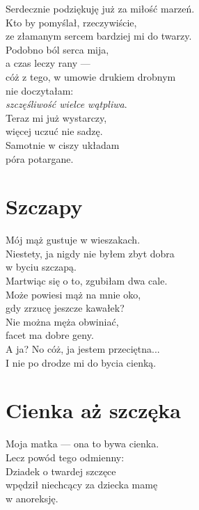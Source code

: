 \documentclass[12pt, a4paper]{memoir}
\begin{document}
\begin{flushleft}
Serdecznie podziękuję już za miłość marzeń.\\
Kto by pomyślał, rzeczywiście,\\
ze złamanym sercem bardziej mi do twarzy.\\[\baselineskip]

Podobno ból serca mija,\\
a czas leczy rany —\\
cóż z tego, w umowie drukiem drobnym\\
nie doczytałam:\\
\textit{szczęśliwość wielce wątpliwa}.\\[\baselineskip]

Teraz mi już wystarczy,\\
więcej uczuć nie sadzę.\\
Samotnie w ciszy układam\\
póra potargane.
\end{flushleft}

\newpage
\section{Szczapy}

\begin{flushleft}
Mój mąż gustuje w wieszakach.\\
Niestety, ja nigdy nie byłem zbyt dobra\\
w byciu szczapą.\\[\baselineskip]

Martwiąc się o to, zgubiłam dwa cale.\\
Może powiesi mąż na mnie oko,\\
gdy zrzucę jeszcze kawałek?\\[\baselineskip]

Nie można męża obwiniać,\\
facet ma dobre geny.\\
A ja? No cóż, ja jestem przeciętna...\\
I nie po drodze mi do bycia cienką.
\end{flushleft}

\newpage
\section{Cienka aż szczęka}

\begin{flushleft}
Moja matka — ona to bywa cienka.\\
Lecz powód tego odmienny:\\
Dziadek o twardej szczęce\\
wpędził niechcący za dziecka mamę\\
w anoreksję.
\end{flushleft}
\end{document}
